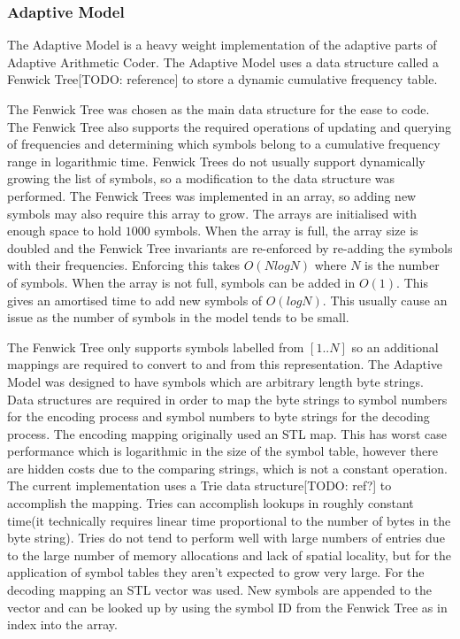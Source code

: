 \documentclass[a4paper,11pt]{report}
\begin{document}
\subsubsection{Adaptive Model}

The Adaptive Model is a heavy weight implementation of the adaptive parts of Adaptive Arithmetic Coder. The Adaptive Model uses a data structure called a Fenwick Tree[TODO: reference] to store a dynamic cumulative frequency table. 

The Fenwick Tree was chosen as the main data structure for the ease to code. The Fenwick Tree also supports the required operations of updating and querying of frequencies and determining which symbols belong to a cumulative frequency range in logarithmic time. Fenwick Trees do not usually support dynamically growing the list of symbols, so a modification to the data structure was performed. The Fenwick Trees was implemented in an array, so adding new symbols may also require this array to grow. The arrays are initialised with enough space to hold $1000$ symbols. When the array is full, the array size is doubled and the Fenwick Tree invariants are re-enforced by re-adding the symbols with their frequencies. Enforcing this takes $O(NlogN)$ where $N$ is the number of symbols. When the array is not full, symbols can be added in $O(1)$. This gives an amortised time to add new symbols of $O(logN)$. This usually cause an issue as the number of symbols in the model tends to be small.

The Fenwick Tree only supports symbols labelled from $[1..N]$ so an additional mappings are required to convert to and from this representation. The Adaptive Model was designed to have symbols which are arbitrary length byte strings. Data structures are required in order to map the byte strings to symbol numbers for the encoding process and symbol numbers to byte strings for the decoding process. The encoding mapping originally used an STL map. This has worst case performance which is logarithmic in the size of the symbol table, however there are hidden costs due to the comparing strings, which is not a constant operation. The current implementation uses a Trie data structure[TODO: ref?] to accomplish the mapping. Tries can accomplish lookups in roughly constant time(it technically requires linear time proportional to the number of bytes in the byte string). Tries do not tend to perform well with large numbers of entries due to the large number of memory allocations and lack of spatial locality, but for the application of symbol tables they aren't expected to grow very large. For the decoding mapping an STL vector was used. New symbols are appended to the vector and can be looked up by using the symbol ID from the Fenwick Tree as in index into the array.
\end{document}
